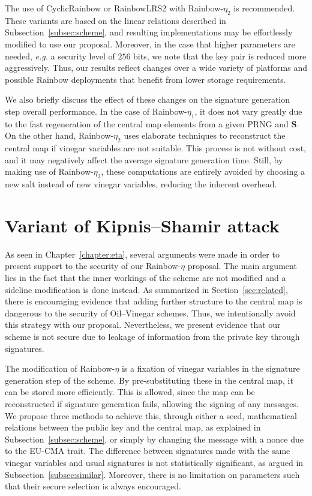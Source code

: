\documentclass[draft, 12pt, a4paper, oneside]{memoir}
\theoremstyle{definition}
\begin{document}
The use of CyclicRainbow or RainbowLRS2 with Rainbow-$\eta_{2}$ is
recommended. These variants are based on the linear relations described in
Subsection~\ref{subsec:scheme}, and resulting implementations may be
effortlessly modified to use our proposal. Moreover, in the case that higher
parameters are needed, \emph{e.g.} a security level of $256$ bits, we note that
the key pair is reduced more aggressively. Thus, our results reflect
changes over a wide variety of platforms and possible Rainbow deployments that
benefit from lower storage requirements.

We also briefly discuss the effect of these changes on the signature generation
step overall performance. In the case of Rainbow-$\eta_{1}$, it does not vary
greatly due to the fast regeneration of the central map elements from a given
PRNG and $\mathbf{S}$. On the other hand, Rainbow-$\eta_{2}$ uses elaborate
techniques to reconstruct the central map if vinegar variables are not
suitable.  This process is not without cost, and it may negatively affect the
average signature generation time. Still, by making use of Rainbow-$\eta_{3}$,
these computations are entirely avoided by choosing a new salt instead of new
vinegar variables, reducing the inherent overhead.

\chapter{Variant of Kipnis--Shamir attack}

As seen in Chapter~\ref{chapter:eta}, several arguments were made in order to present support to the security of our Rainbow-$\eta$ proposal. The main argument lies in the fact that the inner workings of the scheme are not modified and a sideline modification is done instead. As summarized in Section~\ref{sec:related}, there is encouraging evidence that adding further structure to the central map is dangerous to the security of Oil--Vinegar schemes. Thus, we intentionally avoid this strategy with our proposal. Nevertheless, we present evidence that our scheme is not secure due to leakage of information from the private key through signatures.

The modification of Rainbow-$\eta$ is a fixation of vinegar variables in the signature generation step of the scheme. By pre-substituting these in the central map, it can be stored more efficiently. This is allowed, since the map can be reconstructed if signature generation fails, allowing the signing of any messages. We propose three methods to achieve this, through either a seed, mathematical relations between the public key and the central map, as explained in Subsection~\ref{subsec:scheme}, or simply by changing the message with a nonce due to the EU-CMA trait. The difference between signatures made with the same vinegar variables and usual signatures is not statistically significant, as argued in Subsection~\ref{subsec:similar}. Moreover, there is no limitation on parameters such that their secure selection is always encouraged.
\end{document}
